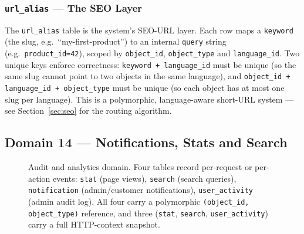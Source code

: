 \documentclass[11pt,a4paper]{article}
\begin{document}
\subsubsection{\texttt{url\_alias} --- The SEO Layer}

The \texttt{url\_alias} table is the system's SEO-URL layer.
Each row maps a \texttt{keyword} (the slug, e.g.\
``my-first-product'') to an internal \texttt{query} string
(e.g.\ \texttt{product\_id=42}), scoped by
\texttt{object\_id}, \texttt{object\_type} and
\texttt{language\_id}. Two unique keys enforce correctness:
\texttt{keyword + language\_id} must be unique (so the same
slug cannot point to two objects in the same language), and
\texttt{object\_id + language\_id + object\_type} must be
unique (so each object has at most one slug per language).
This is a polymorphic, language-aware short-URL system ---
see Section~\ref{sec:seo} for the routing algorithm.

\subsection{Domain 14 --- Notifications, Stats and Search}\label{sec:audit}

\begin{figure}[htbp]
\centering
{}
\caption{Audit and analytics domain. Four tables record
per-request or per-action events: \texttt{stat} (page views),
\texttt{search} (search queries), \texttt{notification}
(admin/customer notifications), \texttt{user\_activity}
(admin audit log). All four carry a polymorphic
\texttt{(object\_id, object\_type)} reference, and three
(\texttt{stat}, \texttt{search}, \texttt{user\_activity})
carry a full HTTP-context snapshot.}
\label{fig:audit}
\end{figure}
\end{document}

